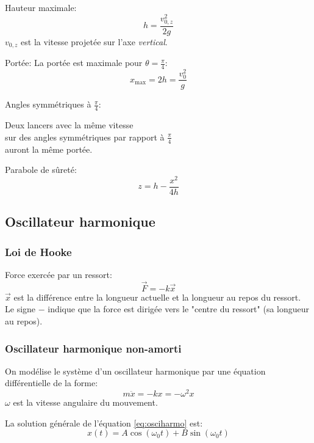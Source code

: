\documentclass{article}
\numberwithin{equation}{section}
\begin{document}
Hauteur maximale:
\begin{equation}
	\boxed{h = \dfrac{v_{0,z}^2}{2g}}
\end{equation}
\(v_{0,z}\) est la vitesse projetée sur l'axe \emph{vertical}.

Portée:
La portée est maximale pour \(\theta = \frac{\pi}{4}\):
\begin{equation}
	x_{\text{max}} = 2h = \dfrac{v_0^2}{g}
\end{equation}

Angles symmétriques à \(\frac{\pi}{4}\):
\begin{center}
	Deux lancers avec la même vitesse \\ sur des angles symmétriques par rapport à \(\frac{\pi}{4}\) \\ auront la même portée.
\end{center}

Parabole de sûreté:
\begin{equation}
	\boxed{z = h - \dfrac{x^2}{4h}}
\end{equation}


\subsection{Oscillateur harmonique}
\subsubsection{Loi de Hooke}
Force exercée par un ressort:
\begin{equation}
	\boxed{\vec F = - k \vec x}
\end{equation}
\(\vec x\) est la différence entre la longueur actuelle et la longueur au repos du ressort. Le signe \(-\) indique que la force est dirigée vers le "centre du ressort" (sa longueur au repos).

\subsubsection{Oscillateur harmonique non-amorti}
On modélise le système d'un oscillateur harmonique par une équation différentielle de la forme:
\begin{equation} \label{eq:osciharmo}
	\boxed{ m \ddot x = - kx = - \omega^2 x }
\end{equation}
\(\omega\) est la vitesse angulaire du mouvement.

La solution générale de l'équation \ref{eq:osciharmo} est:
\begin{equation}
	\boxed{ x(t) = A \cos(\omega_0 t) + B \sin(\omega_0 t) }
\end{equation}
\end{document}
